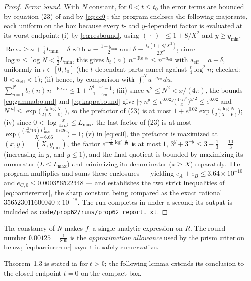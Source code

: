 \documentclass[11pt]{article}
\theoremstyle{definition}
\DeclareMathOperator{\Rea}{Re}
\begin{document}
\begin{proof}
\emph{Error bound.} With $N$ constant, for $0<t\le t_0$ the error
terms are bounded by equation (23) of \cite{Polymath} and by
\eqref{eq:ec0}; the program encloses the following majorants, each
uniform on the box because every $t$- and $y$-dependent factor is
evaluated at its worst endpoint:
(i) by \eqref{eq:resbound}, using $(\,\cdot\,)_+\le1+8/X^2$ and
$y\ge y_{\min}$,
$\Rea s_*\ge a+\frac t4L_{\min}-\delta$ with
$a=\frac{1+y_{\min}}2$ and
$\delta=\frac{t_0(1+8/X^2)}{2X^2}$; since
$\log n\le\log N<\frac12L_{\min}$, this gives
$b_t(n)\,n^{-\Rea s_*}\le n^{-a_{\mathrm{eff}}}$ with
$a_{\mathrm{eff}}=a-\delta$, uniformly in $t\in[0,t_0]$ (the
$t$-dependent parts cancel against $\frac t4\log^2n$; checked:
$0<a_{\mathrm{eff}}<1$);
(ii) hence, by comparison with $\int_1^Nu^{-a_{\mathrm{eff}}}\,du$,
$\sum_{n=1}^{N}b_t(n)\,n^{-\Rea s_*}\le
1+\frac{N^{1-a_{\mathrm{eff}}}-1}{1-a_{\mathrm{eff}}}$;
(iii) since $n^2\le N^2<x/(4\pi)$, the bounds \eqref{eq:gammabound}
and \eqref{eq:kappabound} give
$|\gamma|n^y\le e^{0.02y}\bigl(\frac{4\pi n^2}x\bigr)^{y/2}\le
e^{0.02}$ and
$N^{|\kappa|}\le\exp\bigl(\frac{t_0\log N}{2(X-6)}\bigr)$, so the
prefactor of (23) is at most
$1+e^{0.02}\exp\bigl(\frac{t_0\log N}{2(X-6)}\bigr)$;
(iv) since $0<\log\frac x{4\pi n^2}\le L_{\max}$, the last factor
of (23) is at most
$\exp\bigl(\frac{(t_0^2/16)L_{\max}^2+0.626}{X-6.66}\bigr)-1$;
(v) in \eqref{eq:ec0}, the prefactor is maximized at
$(x,y)=(X,y_{\min})$, the factor $e^{-\frac t{16}\log^2\frac x{4\pi}}$
is at most $1$, $3^y+3^{-y}\le3+\frac13=\frac{10}3$ (increasing in
$y$, and $y\le1$), and the final quotient is bounded by maximizing
its numerator ($L\le L_{\max}$) and minimizing its denominator
($x\ge X$) separately.
The program multiplies and sums these enclosures --- yielding
$e_A+e_B\le3.64\times10^{-10}$ and
$e_{C,0}\le0.000356522648$ --- and establishes the two strict
inequalities of \eqref{eq:barriererror}, the sharp constant being
compared as the exact rational $356523011600040\times10^{-18}$.
The run completes in under a second; its output is included as
\texttt{code/prop62/runs/prop62\_report.txt}.
\end{proof}

The constancy of $N$ makes $f_t$ a single analytic
expression on $R$. The round number $0.00125=\frac1{800}$ is the
\emph{approximation allowance} used by the prism criterion below;
\eqref{eq:barriererror} says it is safely conservative.

Theorem~1.3 is stated in \cite{Polymath} for $t>0$; the following
lemma extends its conclusion to the closed endpoint $t=0$ on the
compact box.
\end{document}

